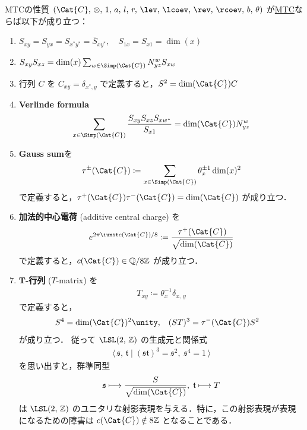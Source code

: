 \documentclass[TQFT_main]{subfiles}
\begin{document}
\begin{myprop}[label=preprop:MTC]{MTCの性質}
    $(\Cat{C},\, \otimes,\, 1,\, a,\, l,\, r,\, \lev,\, \lcoev,\, \rev,\, \rcoev,\, b,\, \theta)$ が\hyperref[def:MTC]{MTC}ならば以下が成り立つ：
    \begin{enumerate}
        \item $S_{xy} = S_{yx} = S_{x^*y^*} = \bar{S}_{xy^*},\quad S_{1x} = S_{x1} = \dim (x)$
        \item $S_{xy} S_{xz} = \dim(x) \sum_{w \in \Simp(\Cat{C})} N^w_{yz} S_{xw}$
        \item 行列 $C$ を $C_{xy} = \delta_{x^*,y}$ で定義すると，$S^2 = \dim(\Cat{C}) C$
        \item \textbf{Verlinde formula}
        \begin{align}
            \sum_{x \in \Simp(\Cat{C})} \frac{S_{xy} S_{xz} S_{xw^*}}{S_{x1}} = \dim(\Cat{C}) N^w_{yz}
        \end{align}
        \item \textbf{Gauss sum}を
        \begin{align}
            \tau^{\pm} (\Cat{C}) \coloneqq \sum_{x \in \Simp(\Cat{C})} \theta_x^{\pm 1} \dim (x)^2
        \end{align}
        で定義すると，$\tau^+(\Cat{C}) \tau^-(\Cat{C}) = \dim (\Cat{C})$ が成り立つ．
        \item \textbf{加法的中心電荷} (additive central charge) を
        \begin{align}
            e^{2\pi \iunit c(\Cat{C})/8} \coloneqq \frac{\tau^+(\Cat{C})}{\sqrt{\dim (\Cat{C})}}
        \end{align}
        で定義すると，$c(\Cat{C}) \in \mathbb{Q} / 8 \mathbb{Z}$ が成り立つ．
        \item \textbf{$\bm{T}$-行列} ($T$-matrix) を
        \begin{align}
            T_{xy} \coloneqq \theta_x^{-1} \delta_{x,\, y}
        \end{align}
        で定義すると，
        \begin{align}
            S^4 &= \dim(\Cat{C})^2 \unity, & (ST)^3 &= \tau^-(\Cat{C}) S^2
        \end{align}
        が成り立つ．
        従って $\LSL(2,\, \mathbb{Z})$ の生成元と関係式
        \begin{align}
            \langle\, \mathfrak{s},\, \mathfrak{t} \mid (\mathfrak{s}\mathfrak{t})^3 = \mathfrak{s}^2,\; \mathfrak{s}^4 = 1 \,\rangle
        \end{align}
        を思い出すと，群準同型
        \begin{align}
            \mathfrak{s} \lmto \frac{S}{\sqrt{\dim (\Cat{C})}},\; \mathfrak{t} \lmto T
        \end{align}
        は $\LSL(2,\, \mathbb{Z})$ のユニタリな射影表現を与える．特に，この射影表現が表現になるための障害は $c(\Cat{C}) \notin 8 \mathbb{Z}$ となることである．
    \end{enumerate}
    
\end{myprop}
\end{document}
